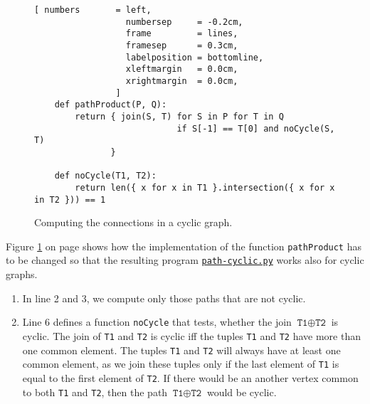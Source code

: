 \begin{figure}[!ht]
  \centering
\begin{Verbatim}[ numbers       = left,
                  numbersep     = -0.2cm,
                  frame         = lines, 
                  framesep      = 0.3cm, 
                  labelposition = bottomline,
                  xleftmargin   = 0.0cm,
                  xrightmargin  = 0.0cm,
                ]
    def pathProduct(P, Q):
        return { join(S, T) for S in P for T in Q
                            if S[-1] == T[0] and noCycle(S, T)
               }
    
    def noCycle(T1, T2):
        return len({ x for x in T1 }.intersection({ x for x in T2 })) == 1
\end{Verbatim} 
\vspace*{-0.3cm}
\caption{Computing the connections in a cyclic graph.}  
\label{fig:path-cyclic.py}
\end{figure} %

Figure \ref{fig:path-cyclic.py} on page shows how the implementation of the function
\texttt{pathProduct} has to be changed so that the resulting program
\href{https://github.com/karlstroetmann/Logik/blob/master/Python/path-cyclic.py}{\texttt{path-cyclic.py}}
works also for cyclic graphs. 
\begin{enumerate}
\item In line 2 and 3, we compute only those paths that are not cyclic.
\item Line 6 defines a function \texttt{noCycle} that tests, whether the join  $\texttt{T1} \oplus \texttt{T2}$ is cyclic.  The join
      of \texttt{T1} and \texttt{T2} is cyclic iff the tuples \texttt{T1} and \texttt{T2} have more
      than one common element.  The tuples \texttt{T1} and \texttt{T2} will always have at least one common element, as we join
      these tuples only if the last element of \texttt{T1} is equal to the first element of  \texttt{T2}.
      If there would be an another vertex common to both \texttt{T1} and \texttt{T2}, then the path
      $\texttt{T1} \oplus \texttt{T2}$ would be cyclic.
\end{enumerate}

